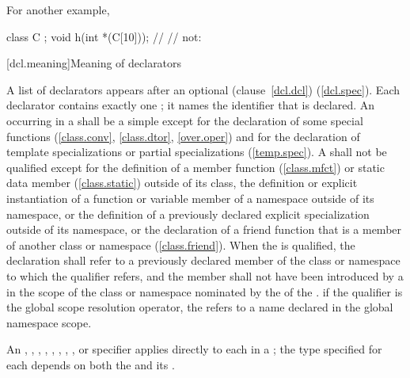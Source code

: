 For another example,

\begin{codeblock}
class C { };
void h(int *(C[10]));           // 
                                // not: 
\end{codeblock}
\exitexampleb

[dcl.meaning]{Meaning of declarators}%

\pnum
A list of declarators appears after an optional (clause~\ref{dcl.dcl})
(\ref{dcl.spec}).
%
Each declarator contains exactly one
;
it names the identifier that is declared.
An
occurring in
a
shall be a simple
except for the declaration of some special functions
(\ref{class.conv}, \ref{class.dtor}, \ref{over.oper}) and
for the declaration of template specializations
or partial specializations (\ref{temp.spec}).
A
shall not be qualified except for the definition of a member
function (\ref{class.mfct}) or static data member (\ref{class.static})
outside of its class,
the definition or explicit instantiation of a
function or variable
member of a namespace
outside of its namespace, or
the definition of a previously declared explicit specialization
outside of its namespace, or
the declaration of a friend function that is a member of
another class or namespace (\ref{class.friend}).
When the
is qualified, the declaration shall refer to a previously declared member
of the class or namespace to which the qualifier refers, and the member
shall not have been introduced by a
in the scope of the class or namespace nominated by the
of the
.
\enternote
if the qualifier is the global
\tcode{::}
scope resolution operator, the
refers to a name declared in the global namespace scope.
\exitnote

\pnum
An
,
,
,
,
,
,
,
,
or
specifier applies directly to each
in a
;
the type specified for each
depends on both the
and its
.

